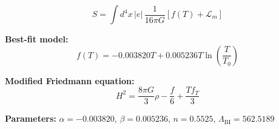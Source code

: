 
\begin{equation}
  S = \int d^4x \, |e| \, \frac{1}{16\pi G} \left[ f(T) + \mathcal{L}_m \right]
\end{equation}

\textbf{Best-fit model:}
\begin{equation}
  f(T) = -0.003820 T + 0.005236 T \ln\!\left(\frac{T}{T_0}\right)
\end{equation}

\textbf{Modified Friedmann equation:}
\begin{equation}
  H^2 = \frac{8\pi G}{3} \rho - \frac{f}{6} + \frac{T f_T}{3}
\end{equation}

\textbf{Parameters:}
$\alpha = -0.003820$, \quad
$\beta = 0.005236$, \quad
$n = 0.5525$, \quad
$\Lambda_{\text{BI}} = 562.5189$